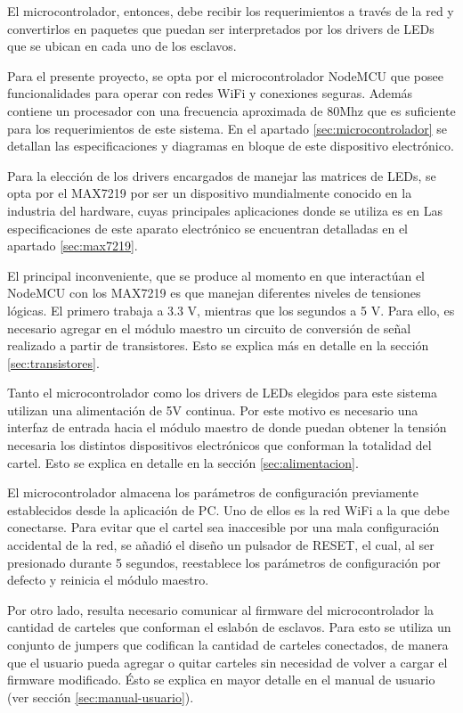 El microcontrolador, entonces, debe recibir los requerimientos a través de la red y convertirlos en paquetes que puedan ser interpretados por los drivers de LEDs que se ubican en cada uno de los esclavos.

Para el presente proyecto, se opta por el microcontrolador NodeMCU que posee funcionalidades para operar con redes WiFi y conexiones seguras. Además contiene un procesador con una frecuencia aproximada de 80Mhz que es suficiente para los requerimientos de este sistema. En el apartado \ref{sec:microcontrolador} se detallan las especificaciones y diagramas en bloque de este dispositivo electrónico.

Para la elección de los drivers encargados de manejar las matrices de LEDs, se opta por el MAX7219 por ser un dispositivo mundialmente conocido en la industria del hardware, cuyas principales aplicaciones donde se utiliza es en 
Las especificaciones de este aparato electrónico se encuentran detalladas en el apartado \ref{sec:max7219}.

El principal inconveniente, que se produce al momento en que interactúan el NodeMCU con los MAX7219 es que manejan diferentes niveles de tensiones lógicas. El primero trabaja a 3.3 V, mientras que los segundos a 5 V. Para ello, es necesario agregar en el módulo maestro un circuito de conversión de señal realizado a partir de transistores. Esto se explica más en detalle en la sección \ref{sec:transistores}.

Tanto el microcontrolador como los drivers de LEDs elegidos para este sistema utilizan una alimentación de 5V continua. Por este motivo es necesario una interfaz de entrada hacia el módulo maestro de donde puedan obtener la tensión necesaria los distintos dispositivos electrónicos que conforman la totalidad del cartel. Esto se explica en detalle en la sección \ref{sec:alimentacion}.

El microcontrolador almacena los parámetros de configuración previamente establecidos desde la aplicación de PC. Uno de ellos es la red WiFi a la que debe conectarse. Para evitar que el cartel sea inaccesible por una mala configuración accidental de la red, se añadió el diseño un pulsador de RESET, el cual, al ser presionado durante 5 segundos, reestablece los parámetros de configuración por defecto y reinicia el módulo maestro.

Por otro lado, resulta necesario comunicar al firmware del microcontrolador la cantidad de carteles que conforman el eslabón de esclavos. Para esto se utiliza un conjunto de jumpers que codifican la cantidad de carteles conectados, de manera que el usuario pueda agregar o quitar carteles sin necesidad de volver a cargar el firmware modificado. Ésto se explica en mayor detalle en el manual de usuario (ver sección \ref{sec:manual-usuario}).

